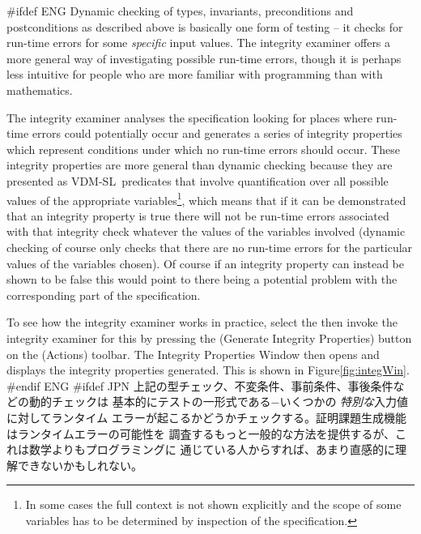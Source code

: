 \documentclass[\pformat,12pt]{article}
\newcommand{\vdmslpp}{VDM-SL}
\newcommand{\vdmslpp}{VDM++}
\newcommand{\aaa}{\tt }
\newcommand{\guicmd}[1]{{\sf #1}}
\newcommand{\guicmd}[1]{{\gt #1}}
\begin{document}
#ifdef ENG
Dynamic checking of types, invariants, preconditions and
postconditions as described above is basically one form of testing --
it checks for run-time errors for some \emph{specific} input
values. The integrity examiner offers a more general way of
investigating possible run-time errors, though it is perhaps less
intuitive for people who are more familiar with programming than with
mathematics.

The integrity examiner analyses the specification looking for places
where run-time errors could potentially occur and generates a series
of integrity properties which represent conditions under which no
run-time errors should occur. These integrity properties are more
general than dynamic checking because they are presented as
 \vdmslpp\ predicates that involve quantification over all
possible values of the appropriate variables\footnote{In some cases
  the full context is not shown explicitly and the scope of some
  variables has to be determined by inspection of the specification.},
which means that if it 
can be demonstrated that an integrity property is true there will
not be run-time errors associated with that integrity check whatever
the values of the variables involved (dynamic checking of course
only checks that there are no run-time errors for the particular
values of the variables chosen). Of course if an integrity property
can instead be shown to be false this would point to there being a
potential problem with the corresponding part of the specification.

To see how the integrity examiner works in practice, select the 
\ifthenelse{\boolean{VDMsl}}{{\aaa DefaultMod} module}{ {\aaa
    ExplSort} class} then invoke the integrity examiner for this
 by pressing the 
(\guicmd{Generate Integrity Properties}) button on the (\guicmd{Actions})
toolbar. The \guicmd{Integrity Properties Window} then opens and
displays the integrity properties generated. This is shown in 
Figure\ref{fig:integWin}.
#endif ENG
#ifdef JPN
上記の型チェック、不変条件、事前条件、事後条件などの動的チェックは
基本的にテストの一形式である−いくつかの \emph{特別な}入力値に対してランタイム
エラーが起こるかどうかチェックする。証明課題生成機能はランタイムエラーの可能性を
調査するもっと一般的な方法を提供するが、これは数学よりもプログラミングに
通じている人からすれば、あまり直感的に理解できないかもしれない。
\end{document}
